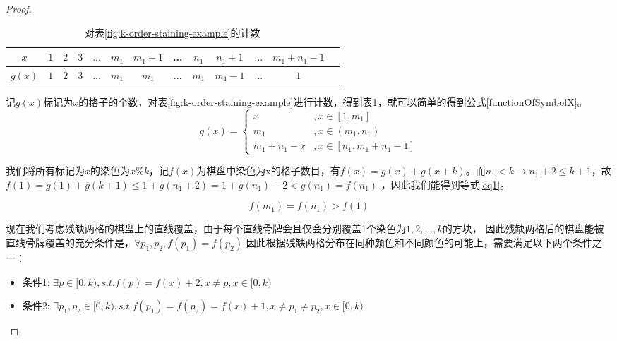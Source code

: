 \begin{proof}
    \begin{table}[htbp]
        \centering
        \caption{对表\ref{fig:k-order-staining-example}的计数}
        \begin{tabular}{|c|c|c|c|c|c|c|c|c|c|c|c|c|}
            \hline
            $x$    & $1$ & $2$ & $3$ & $...$ & $m_1$ & $m_1 + 1$ & ... & $n_1$ & $n_1 + 1$ & $...$ & $m_1 + n_1 - 1$ \\
            \hline
            $g(x)$ & $1$ & $2$ & $3$ & $...$ & $m_1$ & $m_1$     & ... & $m_1$ & $m_1 - 1$ & $...$ & $1$             \\
            \hline
        \end{tabular}
        \label{count}
    \end{table}
    记$g(x)$标记为$x$的格子的个数，对表\ref{fig:k-order-staining-example}进行计数，得到表\ref{count}，就可以简单的得到公式\ref{functionOfSymbolX}。
    \begin{equation}
        g(x)=\left\{
        \begin{aligned}
            x              & , x \in [1, m_1]           \\
            m_1            & , x \in (m_1, n_1)         \\
            m_1 + n_1  - x & , x \in [n_1, m_1 + n_1 - 1]
        \end{aligned}
        \right.
        \label{functionOfSymbolX}
    \end{equation}

    我们将所有标记为$x$的染色为$x \% k$，记$f(x)$为棋盘中染色为x的格子数目，有$f(x) = g(x) + g(x + k)$。而$n_1 < k \rightarrow n_1 + 2 \le k + 1$，故
    $f(1) = g(1) + g(k + 1) \le 1 + g(n_1 + 2) = 1 + g(n_1) - 2 < g(n_1) = f(n_1)$
    ，因此我们能得到等式\ref{eq1}。

    \begin{equation}
        \label{eq1}
        f(m_1) = f(n_1) > f(1)
    \end{equation}

    现在我们考虑残缺两格的棋盘上的直线覆盖，由于每个直线骨牌会且仅会分别覆盖1个染色为$1, 2, ... ,k$的方块，
    因此残缺两格后的棋盘能被直线骨牌覆盖的充分条件是，$\forall p_1, p_2, f(p_1) = f(p_2)$
    因此根据残缺两格分布在同种颜色和不同颜色的可能上，需要满足以下两个条件之一：

    \begin{itemize}
        \item 条件1: $\exists p \in [0, k), s.t. f(p) = f(x) + 2, x \neq p , x \in [0, k)$
        \item 条件2: $\exists p_1, p_2 \in [0, k), s.t. f(p_1) = f(p_2) = f(x) + 1, x \neq p_1 \neq p_2, x \in [0, k)$
    \end{itemize}


\end{proof}
